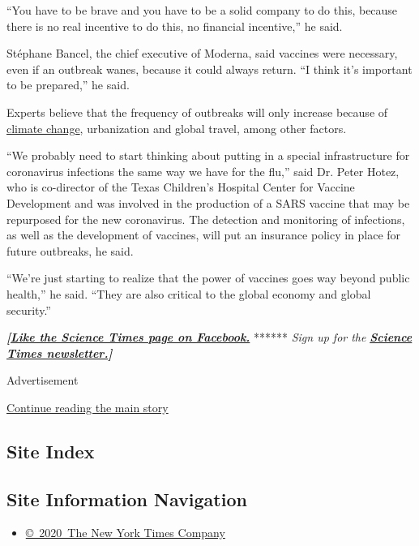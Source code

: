 ``You have to be brave and you have to be a solid company to do this,
because there is no real incentive to do this, no financial incentive,''
he said.

Stéphane Bancel, the chief executive of Moderna, said vaccines were
necessary, even if an outbreak wanes, because it could always return.
``I think it's important to be prepared,'' he said.

Experts believe that the frequency of outbreaks will only increase
because of
\href{https://www.nytimes.com/interactive/2019/06/10/climate/dengue-mosquito-spread-map.html}{climate
change}, urbanization and global travel, among other factors.

``We probably need to start thinking about putting in a special
infrastructure for coronavirus infections the same way we have for the
flu,'' said Dr. Peter Hotez, who is co-director of the Texas Children's
Hospital Center for Vaccine Development and was involved in the
production of a SARS vaccine that may be repurposed for the new
coronavirus. The detection and monitoring of infections, as well as the
development of vaccines, will put an insurance policy in place for
future outbreaks, he said.

``We're just starting to realize that the power of vaccines goes way
beyond public health,'' he said. ``They are also critical to the global
economy and global security.''

\textbf{\emph{{[}}\href{http://on.fb.me/1paTQ1h}{\emph{Like the Science
Times page on Facebook.}}} ****** \emph{\textbar{} Sign up for the}
\textbf{\href{http://nyti.ms/1MbHaRU}{\emph{Science Times
newsletter.}}\emph{{]}}}

Advertisement

\protect\hyperlink{after-bottom}{Continue reading the main story}

\hypertarget{site-index}{%
\subsection{Site Index}\label{site-index}}

\hypertarget{site-information-navigation}{%
\subsection{Site Information
Navigation}\label{site-information-navigation}}

\begin{itemize}
\tightlist
\item
  \href{https://help.nytimes.com/hc/en-us/articles/115014792127-Copyright-notice}{©~2020~The
  New York Times Company}
\end{itemize}

